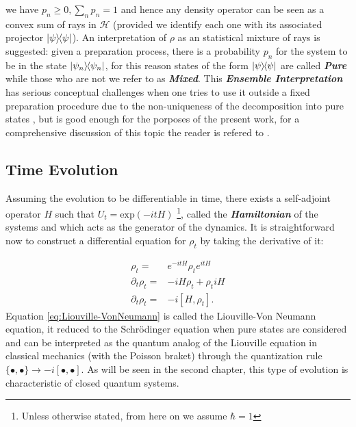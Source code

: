 we have $p_{n}\geq 0, \sum_{n}p_{n}=1$ and hence any density operator can be seen as a convex sum of rays in $\mathcal{H}$ (provided we
identify each one with its associated projector $\ketbra{\psi}$). An interpretation of $\rho$ as an statistical mixture of rays is
suggested: given a preparation process, there is a probability $p_{n}$ for the system to be in the state $\ketbra{\psi_{n}}$, for this
reason states of the form $\ketbra{\psi}$ are called \textbf{\textit{Pure}} while those who are not we refer to as \textbf{\textit{Mixed}}.
This \textbf{\textit{Ensemble Interpretation}} has serious conceptual challenges when one tries to use it outside a
fixed preparation procedure due to the non-uniqueness of the decomposition into pure states \cite{nielsen_quantum_2010},
but is good enough for the porposes of the present work, for a comprehensive discussion of this
topic the reader is refered to \cite{schlosshauer_decoherence_2007}.
\subsection{Time Evolution}
Assuming the evolution to be differentiable in time, there exists a self-adjoint operator $H$ such that $U_{t} = \mathrm{exp}(-itH)$
\footnote{Unless otherwise stated, from here on we assume $\hbar=1$}, called the \textbf{\textit{Hamiltonian}} of the systems and which
acts as the generator of the dynamics. It is straightforward now to construct a differential equation for $\rho_{t}$ by taking the derivative
of it:

\begin{align}
  \rho_{t}=& e^{-itH}\rho_{t}  e^{itH}\\
  \partial_{t}\rho_{t} =& -iH\rho_{t} + \rho_{t}iH\\
  \partial_{t}\rho_{t} =& -i[H, \rho_{t}]\label{eq:Liouville-VonNeumann}.
\end{align}
Equation \eqref{eq:Liouville-VonNeumann} is called the Liouville-Von Neumann equation, it reduced to the Schr\"{o}dinger equation
when pure states are considered and can be interpreted as the quantum analog of the Liouville equation in classical mechanics (with the Poisson
braket) through
the quantization rule $\{\bullet,\bullet\} \to -i[\bullet,\bullet]$. As will be seen in the second chapter, this type of evolution is
characteristic of closed quantum systems.
